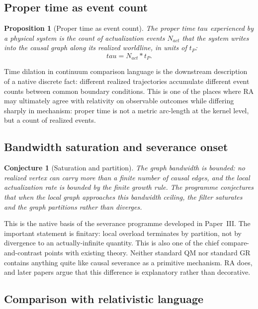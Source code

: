 \documentclass[11pt]{article}
\def\tau{tau}%
\def\mathrm#1{#1}%
\def\cdot{*}%
\newtheorem{proposition}{Proposition}
\newtheorem{conjecture}{Conjecture}
\begin{document}
\subsection{Proper time as event count}

\begin{proposition}[Proper time as event count]
\label{prop:proper_time}
The proper time $\tau$ experienced by a physical system is the count of actualization events $N_{\mathrm{act}}$ that the system writes into the causal graph along its realized worldline, in units of $t_P$:
\begin{equation}
\tau = N_{\mathrm{act}} \cdot t_P.
\end{equation}
\end{proposition}

Time dilation in continuum comparison language is the downstream description of a native discrete fact: different realized trajectories accumulate different event counts between common boundary conditions. This is one of the places where RA may ultimately agree with relativity on observable outcomes while differing sharply in mechanism: proper time is not a metric arc-length at the kernel level, but a count of realized events.

\subsection{Bandwidth saturation and severance onset}

\begin{conjecture}[Saturation and partition]
\label{conj:singularity}
The graph bandwidth is bounded: no realized vertex can carry more than a finite number of causal edges, and the local actualization rate is bounded by the finite growth rule. The programme conjectures that when the local graph approaches this bandwidth ceiling, the filter saturates and the graph partitions rather than diverges.
\end{conjecture}

This is the native basis of the severance programme developed in Paper~III. The important statement is finitary: local overload terminates by partition, not by divergence to an actually-infinite quantity. This is also one of the chief compare-and-contrast points with existing theory. Neither standard QM nor standard GR contains anything quite like causal severance as a primitive mechanism. RA does, and later papers argue that this difference is explanatory rather than decorative.

\subsection{Comparison with relativistic language}
\end{document}
